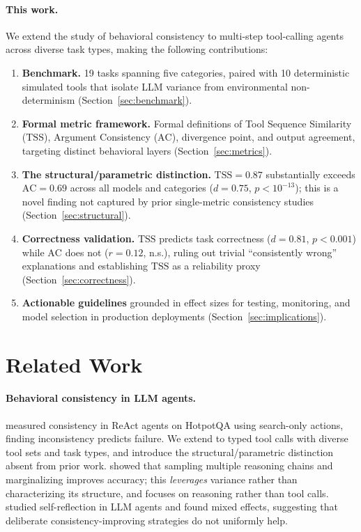 \documentclass[letterpaper]{article}
\newcommand{\tss}{\mathrm{TSS}}
\newcommand{\ac}{\mathrm{AC}}
\begin{document}
\paragraph{This work.}
We extend the study of behavioral consistency to multi-step tool-calling agents
across diverse task types, making the following contributions:

\begin{enumerate}[leftmargin=1.5em]
  \item \textbf{Benchmark.} 19 tasks spanning five categories, paired with
    10 deterministic simulated tools that isolate LLM variance from
    environmental non-determinism (Section~\ref{sec:benchmark}).
  \item \textbf{Formal metric framework.} Formal definitions of Tool Sequence
    Similarity ($\tss$), Argument Consistency ($\ac$), divergence point, and
    output agreement, targeting distinct behavioral layers
    (Section~\ref{sec:metrics}).
  \item \textbf{The structural/parametric distinction.} $\tss = 0.87$ substantially
    exceeds $\ac = 0.69$ across all models and categories ($d = 0.75$,
    $p < 10^{-13}$); this is a novel finding not captured by prior single-metric
    consistency studies (Section~\ref{sec:structural}).
  \item \textbf{Correctness validation.} $\tss$ predicts task correctness
    ($d = 0.81$, $p<0.001$) while $\ac$ does not ($r = 0.12$, n.s.), ruling out
    trivial ``consistently wrong'' explanations and establishing $\tss$ as a
    reliability proxy (Section~\ref{sec:correctness}).
  \item \textbf{Actionable guidelines} grounded in effect sizes for testing,
    monitoring, and model selection in production deployments
    (Section~\ref{sec:implications}).
\end{enumerate}

\section{Related Work}

\paragraph{Behavioral consistency in LLM agents.}
\citet{mehta2026disagree} measured consistency in ReAct agents on HotpotQA using
search-only actions, finding inconsistency predicts failure.
We extend to typed tool calls with diverse tool sets and task types, and introduce
the structural/parametric distinction absent from prior work.
\citet{wang2023selfconsistency} showed that sampling multiple reasoning chains and
marginalizing improves accuracy; this \emph{leverages} variance rather than
characterizing its structure, and focuses on reasoning rather than tool calls.
\citet{renze2024self} studied self-reflection in LLM agents and found mixed
effects, suggesting that deliberate consistency-improving strategies do not
uniformly help.
\end{document}
